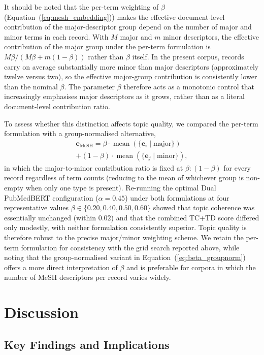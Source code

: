 \documentclass[authorproof,JACIII,researchpaper]{fujipressarticle}
\begin{document}
{\color{red}%
It should be noted that the per-term weighting of $\beta$ (Equation~(\ref{eq:mesh_embedding})) makes the effective document-level contribution of the major-descriptor group depend on the number of major and minor terms in each record. With $M$ major and $m$ minor descriptors, the effective contribution of the major group under the per-term formulation is $M\beta/(M\beta+m(1-\beta))$ rather than $\beta$ itself. In the present corpus, records carry on average substantially more minor than major descriptors (approximately twelve versus two), so the effective major-group contribution is consistently lower than the nominal $\beta$. The parameter $\beta$ therefore acts as a monotonic control that increasingly emphasises major descriptors as it grows, rather than as a literal document-level contribution ratio.
}%

{\color{red}%
To assess whether this distinction affects topic quality, we compared the per-term formulation with a group-normalised alternative,
\begin{multline}
\boldsymbol{e}_{\text{MeSH}} = \beta\cdot\operatorname{mean}(\{\boldsymbol{e}_i \mid \text{major}\}) \\
+ (1-\beta)\cdot\operatorname{mean}(\{\boldsymbol{e}_j \mid \text{minor}\}),
\label{eq:beta_groupnorm}
\end{multline}
in which the major-to-minor contribution ratio is fixed at $\beta:(1-\beta)$ for every record regardless of term counts (reducing to the mean of whichever group is non-empty when only one type is present). Re-running the optimal Dual PubMedBERT configuration ($\alpha=0.45$) under both formulations at four representative values $\beta \in \{0.20, 0.40, 0.50, 0.60\}$ showed that topic coherence was essentially unchanged (within $0.02$) and that the combined TC+TD score differed only modestly, with neither formulation consistently superior. Topic quality is therefore robust to the precise major/minor weighting scheme. We retain the per-term formulation for consistency with the grid search reported above, while noting that the group-normalised variant in Equation~(\ref{eq:beta_groupnorm}) offers a more direct interpretation of $\beta$ and is preferable for corpora in which the number of MeSH descriptors per record varies widely.
}%

\section{Discussion}

\subsection{Key Findings and Implications}
\end{document}
